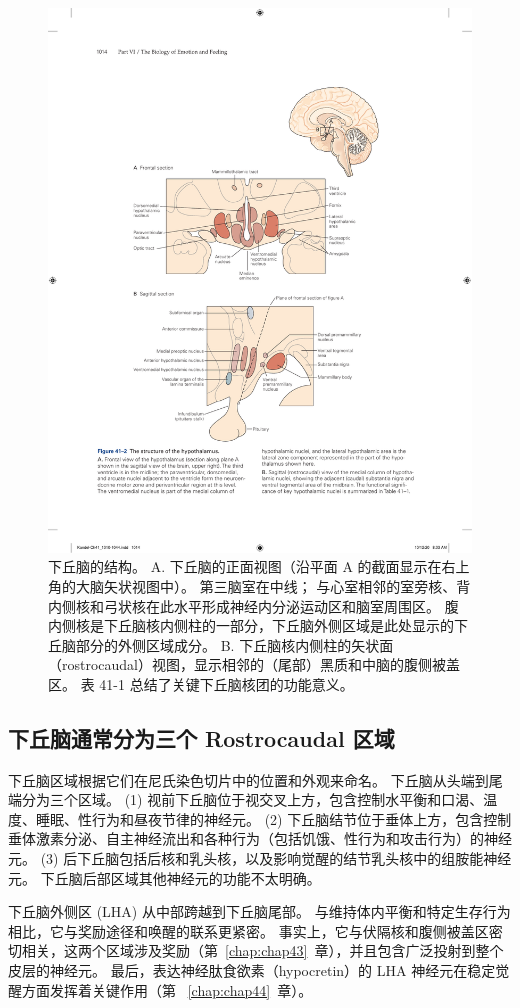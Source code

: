 \begin{figure}[htbp]
	\centering
	\includegraphics[width=0.75\linewidth]{chap41/fig_41_2}
	\caption{下丘脑的结构。 A. 下丘脑的正面视图（沿平面 A 的截面显示在右上角的大脑矢状视图中）。 第三脑室在中线； 与心室相邻的室旁核、背内侧核和弓状核在此水平形成神经内分泌运动区和脑室周围区。 腹内侧核是下丘脑核内侧柱的一部分，下丘脑外侧区域是此处显示的下丘脑部分的外侧区域成分。 B. 下丘脑核内侧柱的矢状面（rostrocaudal）视图，显示相邻的（尾部）黑质和中脑的腹侧被盖区。 表 41-1 总结了关键下丘脑核团的功能意义。}
	\label{fig:41_2}
\end{figure}



\subsection{下丘脑通常分为三个 Rostrocaudal 区域}

下丘脑区域根据它们在尼氏染色切片中的位置和外观来命名。
下丘脑从头端到尾端分为三个区域。
(1) 视前下丘脑位于视交叉上方，包含控制水平衡和口渴、温度、睡眠、性行为和昼夜节律的神经元。
(2) 下丘脑结节位于垂体上方，包含控制垂体激素分泌、自主神经流出和各种行为（包括饥饿、性行为和攻击行为）的神经元。
(3) 后下丘脑包括后核和乳头核，以及影响觉醒的结节乳头核中的组胺能神经元。
下丘脑后部区域其他神经元的功能不太明确。


下丘脑外侧区 (LHA) 从中部跨越到下丘脑尾部。
与维持体内平衡和特定生存行为相比，它与奖励途径和唤醒的联系更紧密。
事实上，它与伏隔核和腹侧被盖区密切相关，这两个区域涉及奖励（第~\ref{chap:chap43}~章），并且包含广泛投射到整个皮层的神经元。
最后，表达神经肽食欲素（hypocretin）的 LHA 神经元在稳定觉醒方面发挥着关键作用（第 ~\ref{chap:chap44}~章）。



